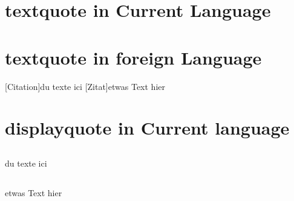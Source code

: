 \documentclass{article}
\begin{document}
\section{textquote in Current Language}

\subsection{\languagename}

\subsection{\languagename}

\subsection{\languagename}

\section{textquote in foreign Language}

[Citation]{du texte ici}
[Zitat]{etwas Text hier}

\section{displayquote in Current language}

\subsection{\languagename}
\begin{displayquote}[Citation]
du texte ici
\end{displayquote}

\subsection{\languagename}
\begin{displayquote}[Zitat]
etwas Text hier
\end{displayquote}
\end{document}
